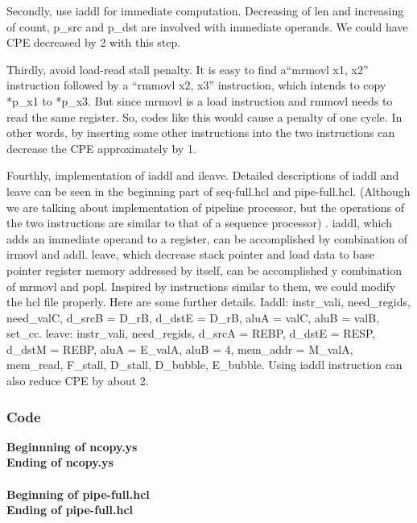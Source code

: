 \documentclass{article}
\begin{document}
	   \par Secondly, use iaddl for immediate computation. Decreasing of len and increasing of count, p\_src and p\_dst are involved with immediate operands. We could have CPE decreased by 2 with this step.
	   \par Thirdly, avoid load-read stall penalty. It is easy to find a“mrmovl x1, x2” instruction followed by a “rmmovl x2, x3” instruction, which intends to copy *p\_x1 to *p\_x3. But since mrmovl is a load instruction and rmmovl needs to read the same register. So, codes like this would cause a penalty of one cycle. In other words, by inserting some other instructions into the two instructions can decrease the CPE approximately by 1.
	   \par Fourthly, implementation of iaddl and ileave. Detailed descriptions of iaddl and leave can be seen in the beginning part of seq-full.hcl and pipe-full.hcl. (Although we are talking about implementation of pipeline processor, but the operations of the two instructions are similar to that of a sequence processor) . iaddl, which adds an immediate operand to a register, can be accomplished by combination of irmovl and addl. leave, which decrease stack pointer and load data to base pointer register memory addressed by itself, can be accomplished y combination of mrmovl and popl. Inspired by instructions similar to them, we could modify the hcl file properly. Here are some further details. Iaddl: instr\_vali, need\_regids, need\_valC, d\_srcB = D\_rB, d\_dstE = D\_rB, aluA = valC, aluB = valB, set\_cc. leave: instr\_vali, need\_regids, d\_srcA = REBP, d\_dstE = RESP, d\_dstM = REBP, aluA = E\_valA, aluB = 4, mem\_addr = M\_valA, mem\_read, F\_stall, D\_stall, D\_bubble, E\_bubble. Using iaddl instruction can also reduce CPE by about 2.\\


\subsubsection{Code}


    \textbf{Beginnning of ncopy.ys} \\

\textbf{Ending of ncopy.ys} \\
\\
\textbf{Beginning of pipe-full.hcl} \\



\textbf{Ending of pipe-full.hcl} \\
\end{document}
